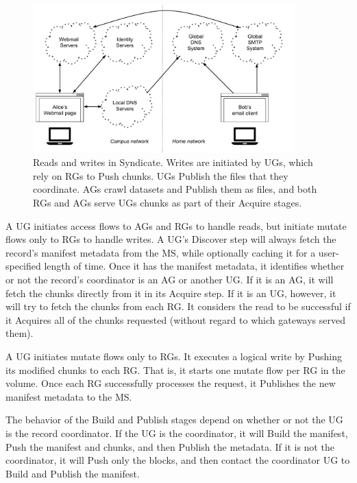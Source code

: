 \begin{figure}[h]
   \centering
   \includegraphics[width=0.9\textwidth,page=21]{figures/dissertation-figures}
   \caption{Reads and writes in Syndicate.  Writes are initiated by UGs, which
   rely on RGs to Push chunks.  UGs Publish the files that they coordinate.  AGs
   crawl datasets and Publish them as files, and both RGs and AGs serve UGs
   chunks as part of their Acquire stages.}
   \label{fig:chap3-syndicate-reads-writes}
\end{figure}

A UG initiates access flows to AGs and RGs to handle reads, but initiate mutate
flows only to RGs to handle writes.  A UG's Discover step will always fetch the
record's manifest metadata from the MS, while optionally caching it for a
user-specified length of time.  Once it has the manifest metadata, it identifies
whether or not the record's coordinator is an AG or another UG.   If it is an
AG, it will fetch the chunks directly from it in its Acquire step.  If it is an
UG, however, it will try to fetch the chunks from each RG.  It considers the
read to be successful if it Acquires all of the chunks requested (without regard
to which gateways served them).

A UG initiates mutate flows only to RGs.  It executes a logical write by Pushing
its modified chunks to each RG.  That is, it starts one mutate flow per RG in
the volume.  Once each RG successfully processes the request, it Publishes the
new manifest metadata to the MS.

The behavior of the Build and Publish stages depend on whether or not the UG is
the record coordinator.  If the UG is the coordinator, it will Build the
manifest, Push the manifest and chunks, and then Publish the metadata.  If it is
not the coordinator, it will Push only the blocks, and then
contact the coordinator UG to Build and Publish the manifest.

